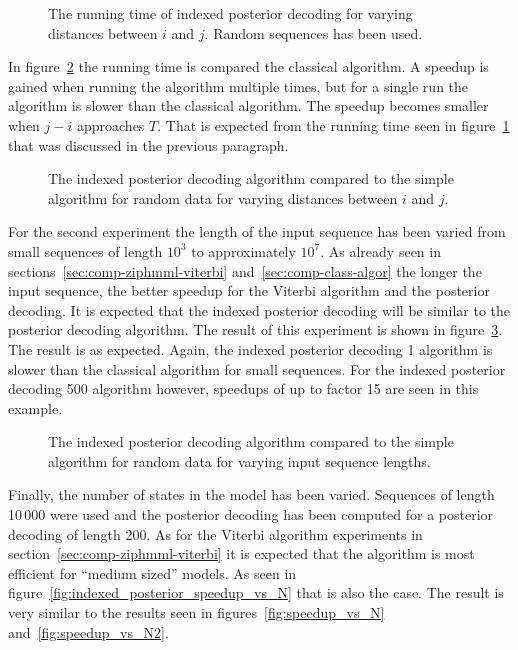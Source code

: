 \begin{figure}
  \centering
  
  \caption{The running time of indexed posterior decoding for varying distances
    between $i$ and $j$. Random sequences has been used.}
  \label{fig:assymptotic_indexed_posterior_subseq_length.tex}
\end{figure}

In figure~\ref{fig:indexed_posterior_speedup_vs_subseq} the running time is
compared the classical algorithm. A speedup is gained when running the
algorithm multiple times, but for a single run the algorithm is slower than the
classical algorithm. The speedup becomes smaller when $j - i$ approaches
$T$. That is expected from the running time seen in
figure~\ref{fig:assymptotic_indexed_posterior_subseq_length.tex} that was
discussed in the previous paragraph.

\begin{figure}
  \centering
  
  \caption{The indexed posterior decoding algorithm compared to the simple
    algorithm for random data for varying distances between $i$ and $j$.}
  \label{fig:indexed_posterior_speedup_vs_subseq}
\end{figure}

For the second experiment the length of the input sequence has been varied from
small sequences of length $10^3$ to approximately $10^7$. As already seen in
sections~\ref{sec:comp-ziphmml-viterbi} and~\ref{sec:comp-class-algor} the
longer the input sequence, the better speedup for the Viterbi algorithm and the
posterior decoding. It is expected that the indexed posterior
decoding will be similar to the posterior decoding algorithm. The
result of this experiment is shown in
figure~\ref{fig:indexed_posterior_speedup_vs_T}. The result is as
expected. Again, the indexed posterior decoding 1 algorithm is slower than
the classical algorithm for small sequences. For the indexed posterior
decoding 500 algorithm however, speedups of up to factor 15 are seen in this
example.

\begin{figure}
  \centering
  
  \caption{The indexed posterior decoding algorithm compared to the simple
    algorithm for random data for varying input sequence lengths.}
  \label{fig:indexed_posterior_speedup_vs_T}
\end{figure}

Finally, the number of states in the model has been varied. Sequences of length
10\,000 were used and the posterior decoding has been computed for a posterior decoding of
length 200. As for the Viterbi algorithm experiments in
section~\ref{sec:comp-ziphmml-viterbi} it is expected that the algorithm is
most efficient for ``medium sized'' models. As seen in
figure~\ref{fig:indexed_posterior_speedup_vs_N} that is also the case. The
result is very similar to the results seen in figures~\ref{fig:speedup_vs_N}
and~\ref{fig:speedup_vs_N2}.

